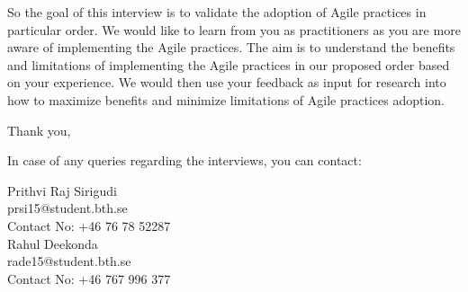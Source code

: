 \documentclass[a4paper,oneside]{bth}
\begin{document}
\begin{appendices}
So the goal of this interview is to validate the adoption of Agile practices in particular order. We would like to learn from you as practitioners as you are more aware of implementing the Agile practices. The aim is to understand the benefits and limitations of implementing the Agile practices in our proposed order based on your experience. We would then use your feedback as input for research into how to maximize benefits and minimize limitations of Agile practices adoption. 

Thank you,

In case of any queries regarding the interviews, you can contact:
\begin{flushleft}


Prithvi Raj Sirigudi\\
prsi15@student.bth.se\\
Contact No: +46 76 78 52287\\

Rahul Deekonda\\
rade15@student.bth.se\\
Contact No: +46 767 996 377\\
\end{flushleft}

            \end{appendices}
            
            
\end{document}
